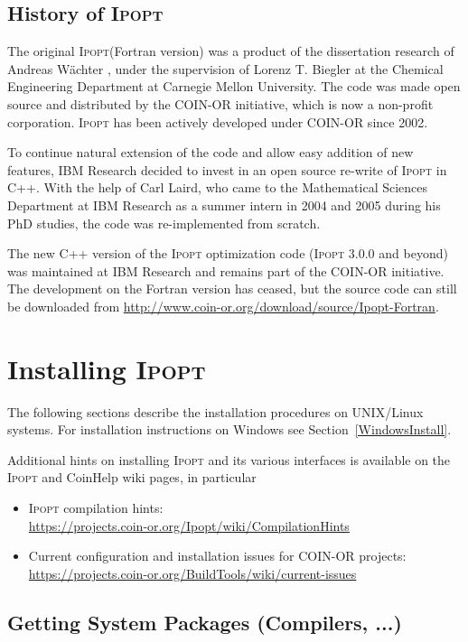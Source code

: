 \documentclass[10pt]{article}
\newcommand{\Ipopt}{\textsc{Ipopt}\xspace}
\begin{document}
\subsection{History of \Ipopt}
The original \Ipopt (Fortran version) was a product of the
dissertation research of Andreas W\"achter \cite{WaechterPhD}, under
the supervision of Lorenz T. Biegler at the Chemical Engineering
Department at Carnegie Mellon University. The code was made open
source and distributed by the COIN-OR initiative, which is now a
non-profit corporation.  \Ipopt has been actively developed under
COIN-OR since 2002.

To continue natural extension of the code and allow easy addition of
new features, IBM Research decided to invest in an open source
re-write of \Ipopt in C++.  With the help of Carl Laird, who came to
the Mathematical Sciences Department at IBM Research as a summer
intern in 2004 and 2005 during his PhD studies, the code was
re-implemented from scratch.

The new C++ version of the \Ipopt optimization code (\Ipopt 3.0.0
and beyond) was maintained at IBM Research and remains part of the
COIN-OR initiative. The development on the Fortran version has
ceased, but the source code can still be downloaded from \url{http://www.coin-or.org/download/source/Ipopt-Fortran}.

\section{Installing \Ipopt}\label{Installing}

The following sections describe the installation procedures on
UNIX/Linux systems.  For installation instructions on Windows
see Section~\ref{WindowsInstall}.

Additional hints on installing \Ipopt and its various interfaces is available
on the \Ipopt and CoinHelp wiki pages, in particular
\begin{itemize}
\item \Ipopt compilation hints:\\
  \url{https://projects.coin-or.org/Ipopt/wiki/CompilationHints}
\item Current configuration and installation issues for COIN-OR projects:\\
  \url{https://projects.coin-or.org/BuildTools/wiki/current-issues}
\end{itemize}

\subsection{Getting System Packages (Compilers, ...)}
\end{document}
